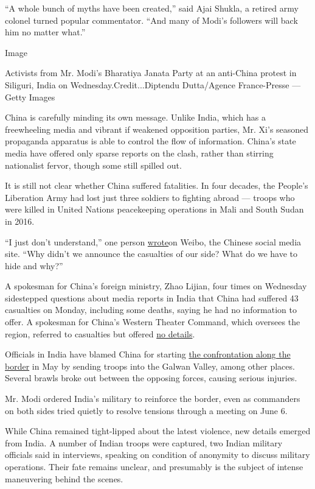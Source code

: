 ``A whole bunch of myths have been created,'' said Ajai Shukla, a
retired army colonel turned popular commentator. ``And many of Modi's
followers will back him no matter what.''

Image

Activists from Mr. Modi's Bharatiya Janata Party at an anti-China
protest in Siliguri, India on Wednesday.Credit...Diptendu Dutta/Agence
France-Presse --- Getty Images

China is carefully minding its own message. Unlike India, which has a
freewheeling media and vibrant if weakened opposition parties, Mr. Xi's
seasoned propaganda apparatus is able to control the flow of
information. China's state media have offered only sparse reports on the
clash, rather than stirring nationalist fervor, though some still
spilled out.

It is still not clear whether China suffered fatalities. In four
decades, the People's Liberation Army had lost just three soldiers to
fighting abroad --- troops who were killed in United Nations
peacekeeping operations in Mali and South Sudan in 2016.

``I just don't understand,'' one person
\href{https://m.weibo.cn/2615417307/4516740824521878}{wrote}on Weibo,
the Chinese social media site. ``Why didn't we announce the casualties
of our side? What do we have to hide and why?''

A spokesman for China's foreign ministry, Zhao Lijian, four times on
Wednesday sidestepped questions about media reports in India that China
had suffered 43 casualties on Monday, including some deaths, saying he
had no information to offer. A spokesman for China's Western Theater
Command, which oversees the region, referred to casualties but offered
\href{http://eng.mod.gov.cn/news/2020-06/16/content_4866818.htm}{no
details}.

Officials in India have blamed China for starting
\href{https://www.nytimes.com/2020/05/30/world/asia/india-china-border.html}{the
confrontation along the border} in May by sending troops into the Galwan
Valley, among other places. Several brawls broke out between the
opposing forces, causing serious injuries.

Mr. Modi ordered India's military to reinforce the border, even as
commanders on both sides tried quietly to resolve tensions through a
meeting on June 6.

While China remained tight-lipped about the latest violence, new details
emerged from India. A number of Indian troops were captured, two Indian
military officials said in interviews, speaking on condition of
anonymity to discuss military operations. Their fate remains unclear,
and presumably is the subject of intense maneuvering behind the scenes.

